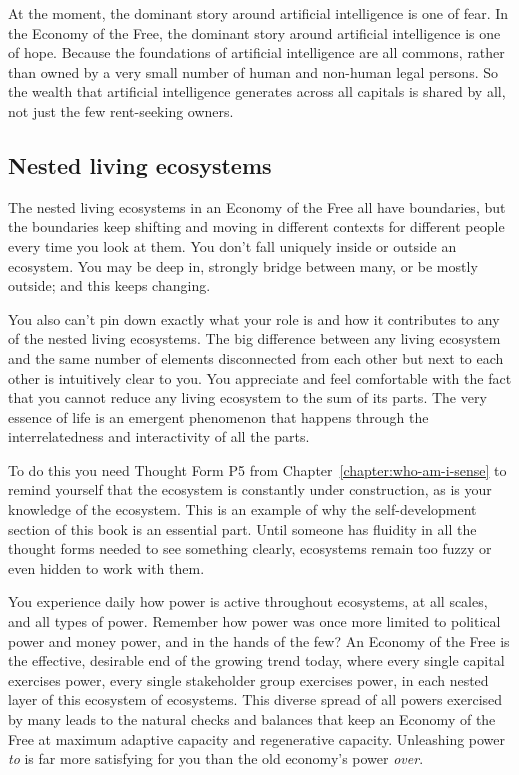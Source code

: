 At the moment, the dominant story around artificial intelligence  is one of fear. In the Economy of the Free, the dominant story around artificial intelligence is one of hope. Because the foundations of artificial intelligence are all commons, rather than owned by a very small number of human and non-human legal persons. So the wealth that artificial intelligence generates across all capitals is shared by all, not just the few rent-seeking owners.
\subsection{Nested living ecosystems}
\label{section:living-ecosystems}


The nested living ecosystems\cite{wahl-regenerative} in an Economy of the Free all have boundaries, but the boundaries keep shifting and moving in different contexts for different people every time you look at them. You don't fall uniquely inside or outside an ecosystem. You may be deep in, strongly bridge between many, or be mostly outside; and this keeps changing.


You also can't pin down exactly what your role is and how it contributes to any of the nested living ecosystems. The big difference between any living ecosystem and the same number of elements disconnected from each other but next to each other is intuitively clear to you. You appreciate and feel comfortable with the fact that you cannot reduce any living ecosystem to the sum of its parts. The very essence of life is an emergent phenomenon that happens through the interrelatedness and interactivity of all the parts. 


To do this you need Thought Form P5  from Chapter~\ref{chapter:who-am-i-sense} to remind yourself that the ecosystem is constantly under construction, as is your knowledge of the ecosystem. This is an example of why the self-development section of this book is an essential part. Until someone has fluidity in all the thought forms needed to see something clearly, ecosystems remain too fuzzy or even hidden to work with them. 


You experience daily how power is active throughout ecosystems, at all scales, and all types of power. Remember how power was once more limited to political power and money power, and in the hands of the few? An Economy of the Free is the effective, desirable end of the growing trend today, where every single capital exercises power, every single stakeholder group exercises power, in each nested layer of this ecosystem of ecosystems. This diverse spread of all powers exercised by many leads to the natural checks and balances that keep an Economy of the Free at maximum adaptive capacity and regenerative capacity. Unleashing power \emph{to} is far more satisfying for you than the old economy’s power \emph{over}\cite{kahane-power-and-love}.


